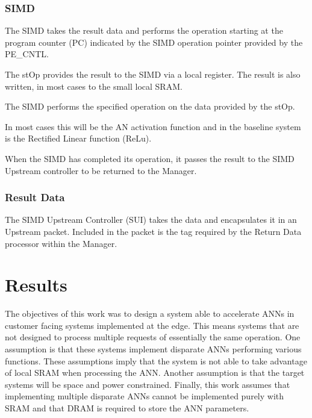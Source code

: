\documentclass[journal]{IEEEtran}
\begin{document}
\subsubsection{SIMD}
\label{ssec:simd}

The SIMD takes the result data and performs the operation starting at the program counter (PC) indicated by the SIMD operation pointer provided by the PE\_CNTL.

The stOp provides the result to the SIMD via a local register. The result is also written, in most cases to the small local SRAM.

The SIMD performs the specified operation on the data provided by the stOp.

In most cases this will be the AN activation function and in the baseline system is the Rectified Linear function (ReLu).

When the SIMD has completed its operation, it passes the result to the SIMD Upstream controller to be returned to the Manager.

\subsubsection{Result Data}
\label{ssec:result}

The SIMD Upstream Controller (SUI) takes the data and encapsulates it in an Upstream packet. Included in the packet is the tag required by the Return Data processor within the Manager.



\section{Results}
\label{sec:Results}
The objectives of this work was to design a system able to accelerate ANNs in customer facing systems implemented at the edge. This means systems that are not designed
to process multiple requests of essentially the same operation.
One assumption is that these systems implement disparate ANNs performing various functions. These assumptions imply that the system is not able to take advantage of local SRAM when processing the ANN.
Another assumption is that the target systems will be space and power constrained.
Finally, this work assumes that implementing multiple disparate ANNs cannot be implemented purely with SRAM and that DRAM is required to store the ANN parameters.
\end{document}
